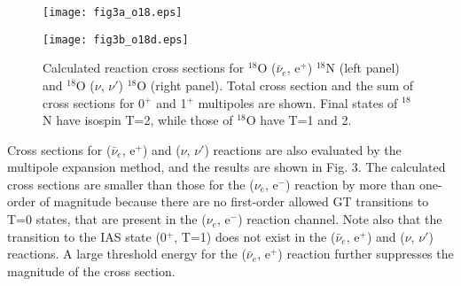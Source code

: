 \documentclass[preprint,12pt]{elsarticle}
\begin{document}
\begin{figure}[htbp]
\vspace*{-0.5cm}
\hspace{-8mm}
\begin{minipage}{0.45\hsize}
\begin{center}
\texttt{[image: fig3a\_o18.eps]}
\end{center}
\end{minipage}
\hspace{5mm}
\begin{minipage}{0.45\hsize}
\begin{center}
\texttt{[image: fig3b\_o18d.eps]}
\end{center}
\end{minipage}
\vspace{-2cm}
\caption{\small 
Calculated reaction cross sections for $^{18}$O ($\bar{\nu}_e$, e$^{+}$) $^{18}$N (left panel) and $^{18}$O ($\nu$, $\nu'$) $^{18}$O (right panel).
Total cross section and the sum of cross sections for 0$^{+}$ and 1$^{+}$ multipoles are shown.  
Final states of $^{18}$N have isospin T=2, while those of $^{18}$O have T=1 and 2.}
\label{croson18}
\end{figure}


Cross sections for ($\bar{\nu}_e$, e$^{+}$) and ($\nu$, $\nu'$) reactions are also evaluated by the multipole expansion method, and the results are shown in Fig. 3.
The calculated cross sections are smaller than those for the ($\nu_e$, e$^{-}$) reaction by more than one-order of magnitude 
because there are no 
first-order allowed GT transitions to T=0 states, that are present in the ($\nu_e$, e$^{-}$) reaction channel.
Note also that the transition to the IAS state (0$^{+}$, T=1) does not exist in the ($\bar{\nu}_e$, e$^{+}$) and ($\nu$, $\nu'$) reactions.
A large threshold energy for the ($\bar{\nu}_e$, e$^{+}$) reaction further suppresses the magnitude of the cross section.
\end{document}
